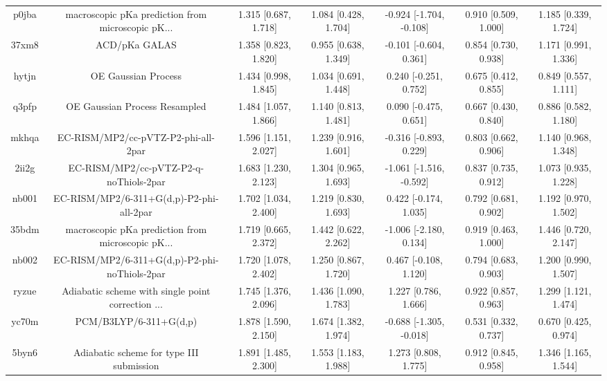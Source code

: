 \documentclass{article}
\begin{document}
\begin{center}
\begin{longtable}{|ccccccc|}
 p0jba &  macroscopic pKa prediction from microscopic pK... &  1.315 [0.687, 1.718] &  1.084 [0.428, 1.704] &  -0.924 [-1.704, -0.108] &  0.910 [0.509, 1.000] &   1.185 [0.339, 1.724] \\
 37xm8 &                                      ACD/pKa GALAS &  1.358 [0.823, 1.820] &  0.955 [0.638, 1.349] &   -0.101 [-0.604, 0.361] &  0.854 [0.730, 0.938] &   1.171 [0.991, 1.336] \\
 hytjn &                                OE Gaussian Process &  1.434 [0.998, 1.845] &  1.034 [0.691, 1.448] &    0.240 [-0.251, 0.752] &  0.675 [0.412, 0.855] &   0.849 [0.557, 1.111] \\
 q3pfp &                      OE Gaussian Process Resampled &  1.484 [1.057, 1.866] &  1.140 [0.813, 1.481] &    0.090 [-0.475, 0.651] &  0.667 [0.430, 0.840] &   0.886 [0.582, 1.180] \\
 mkhqa &                EC-RISM/MP2/cc-pVTZ-P2-phi-all-2par &  1.596 [1.151, 2.027] &  1.239 [0.916, 1.601] &   -0.316 [-0.893, 0.229] &  0.803 [0.662, 0.906] &   1.140 [0.968, 1.348] \\
 2ii2g &             EC-RISM/MP2/cc-pVTZ-P2-q-noThiols-2par &  1.683 [1.230, 2.123] &  1.304 [0.965, 1.693] &  -1.061 [-1.516, -0.592] &  0.837 [0.735, 0.912] &   1.073 [0.935, 1.228] \\
 nb001 &           EC-RISM/MP2/6-311+G(d,p)-P2-phi-all-2par &  1.702 [1.034, 2.400] &  1.219 [0.830, 1.693] &    0.422 [-0.174, 1.035] &  0.792 [0.681, 0.902] &   1.192 [0.970, 1.502] \\
 35bdm &  macroscopic pKa prediction from microscopic pK... &  1.719 [0.665, 2.372] &  1.442 [0.622, 2.262] &   -1.006 [-2.180, 0.134] &  0.919 [0.463, 1.000] &   1.446 [0.720, 2.147] \\
 nb002 &      EC-RISM/MP2/6-311+G(d,p)-P2-phi-noThiols-2par &  1.720 [1.078, 2.402] &  1.250 [0.867, 1.720] &    0.467 [-0.108, 1.120] &  0.794 [0.683, 0.903] &   1.200 [0.990, 1.507] \\
 ryzue &  Adiabatic scheme with single point correction ... &  1.745 [1.376, 2.096] &  1.436 [1.090, 1.783] &     1.227 [0.786, 1.666] &  0.922 [0.857, 0.963] &   1.299 [1.121, 1.474] \\
 yc70m &                             PCM/B3LYP/6-311+G(d,p) &  1.878 [1.590, 2.150] &  1.674 [1.382, 1.974] &  -0.688 [-1.305, -0.018] &  0.531 [0.332, 0.737] &   0.670 [0.425, 0.974] \\
 5byn6 &           Adiabatic scheme for type III submission &  1.891 [1.485, 2.300] &  1.553 [1.183, 1.988] &     1.273 [0.808, 1.775] &  0.912 [0.845, 0.958] &   1.346 [1.165, 1.544] \\

\end{longtable}
\end{center}
\end{document}
